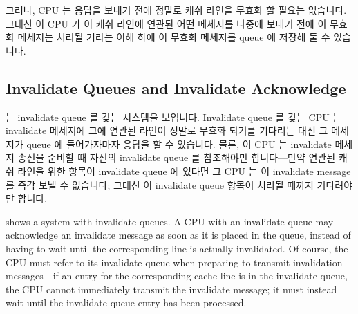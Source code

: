 그러나, CPU 는 응답을 보내기 전에 정말로 캐쉬 라인을 무효화 할 필요는 없습니다.
그대신 이 CPU 가 이 캐쉬 라인에 연관된 어떤 메세지를 나중에 보내기 전에 이
무효화 메세지는 처리될 거라는 이해 하에 이 무효화 메세지를 queue 에 저장해 둘
수 있습니다.

\iffalse

One reason that invalidate acknowledge messages can take so long
is that they must ensure that the corresponding cache line is
actually invalidated, and this invalidation can be delayed if
the cache is busy, for example, if the CPU is intensively loading
and storing data, all of which resides in the cache.
In addition, if a large number of invalidate messages arrive
in a short time period, a given CPU might fall behind in processing
them, thus possibly stalling all the other CPUs.

However, the CPU need not actually invalidate the cache line
before sending the acknowledgement.
It could instead queue the invalidate message with the understanding
that the message will be processed before the CPU sends any further
messages regarding that cache line.

\fi

\subsection{Invalidate Queues and Invalidate Acknowledge}
\label{sec:app:whymb:Invalidate Queues and Invalidate Acknowledge}

는 invalidate queue 를 갖는 시스템을 보입니다.
Invalidate queue 를 갖는 CPU 는 invalidate 메세지에 그에 연관된 라인이 정말로
무효화 되기를 기다리는 대신 그 메세지가 queue 에 들어가자마자 응답을 할 수
있습니다.
물론, 이 CPU 는 invalidate 메세지 송신을 준비할 때 자신의 invalidate queue 를
참조해야만 합니다---만약 연관된 캐쉬 라인을 위한 항목이 invalidate queue 에
있다면 그 CPU 는 이 invalidate message 를 즉각 보낼 수 없습니다; 그대신 이
invalidate queue 항목이 처리될 때까지 기다려야만 합니다.

\iffalse

shows a system with invalidate queues.
A CPU with an invalidate queue may acknowledge an invalidate message
as soon as it is placed in the queue, instead of having to wait until
the corresponding line is actually invalidated.
Of course, the CPU must refer to its invalidate queue when preparing
to transmit invalidation messages---if an entry for the corresponding
cache line is in the invalidate queue, the CPU cannot immediately
transmit the invalidate message; it must instead wait until the
invalidate-queue entry has been processed.

